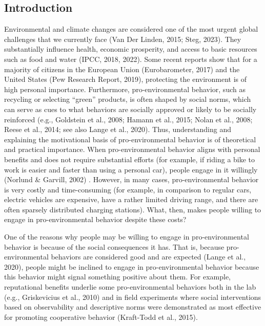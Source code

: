 \documentclass[
]{article}
\begin{document}
\subsection{Introduction}\label{introduction}

Environmental and climate changes are considered one of the most urgent
global challenges that we currently face (Van Der Linden, 2015; Steg,
2023). They substantially influence health, economic prosperity, and
access to basic resources such as food and water (IPCC, 2018, 2022).
Some recent reports show that for a majority of citizens in the European
Union (Eurobarometer, 2017) and the United States (Pew Research Report,
2019), protecting the environment is of high personal importance.
Furthermore, pro-environmental behavior, such as recycling or selecting
``green'' products, is often shaped by social norms, which can serve as
cues to what behaviors are socially approved or likely to be socially
reinforced (e.g., Goldstein et al., 2008; Hamann et al., 2015; Nolan et
al., 2008; Reese et al., 2014; see also Lange et al., 2020). Thus,
understanding and explaining the motivational basis of pro-environmental
behavior is of theoretical and practical importance. When
pro-environmental behavior aligns with personal benefits and does not
require substantial efforts (for example, if riding a bike to work is
easier and faster than using a personal car), people engage in it
willingly (Norlund \& Garvill, 2002) . However, in many cases,
pro-environmental behavior is very costly and time-consuming (for
example, in comparison to regular cars, electric vehicles are expensive,
have a rather limited driving range, and there are often sparsely
distributed charging stations). What, then, makes people willing to
engage in pro-environmental behavior despite these costs?

One of the reasons why people may be willing to engage in
pro-environmental behavior is because of the social consequences it has.
That is, because pro-environmental behaviors are considered good and are
expected (Lange et al., 2020), people might be inclined to engage in
pro-environmental behavior because this behavior might signal something
positive about them. For example, reputational benefits underlie some
pro-environmental behaviors both in the lab (e.g., Griskevicius et al.,
2010) and in field experiments where social interventions based on
observability and descriptive norms were demonstrated as most effective
for promoting cooperative behavior (Kraft-Todd et al., 2015).
\end{document}
